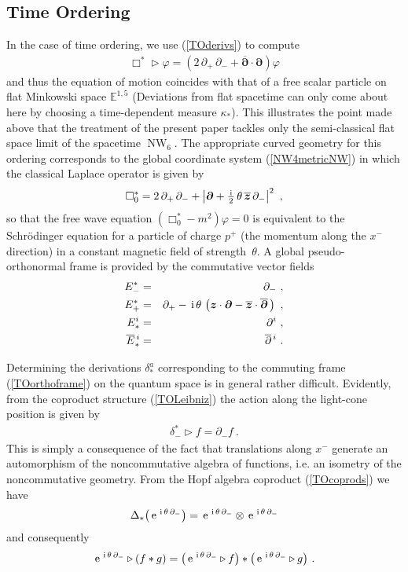 \documentclass[11pt,a4paper]{article}
\DeclareMathOperator{\NW}{NW}
\def\nn{\nonumber}
\newcommand{\1}{\mathbb{1}}
\newcommand{\mbf}[1]{{\boldsymbol {#1} }}
\def\ii{{\,{\rm i}\,}}
\def\mz{{\mbf z}}
\def\mdell{{\mbf\partial}}
\newcommand{\eucl}{{\mathbb E}}
\def\nn{\nonumber}
\def\e{{\,\rm e}\,}
\def\bea{\begin{eqnarray}}
\def\eea{\end{eqnarray}}
\newcommand{\beq}{\begin{eqnarray}}
\newcommand{\eeq}{\end{eqnarray}}
\begin{document}
\subsection{Time Ordering\label{ScalarTO}}

In the case of time ordering, we use (\ref{TOderivs}) to compute
\beq
\Box^*\triangleright\varphi=\left(2\,\partial_+\,\partial_-+
\overline{\mdell}\cdot\mdell\right)\varphi
\label{TOBoxeq}\eeq
and thus the equation of motion coincides with that of a free scalar
particle on flat Minkowski space $\eucl^{1,5}$ (Deviations from
flat spacetime can only come about here by choosing a time-dependent measure
$\kappa_*$). This illustrates the point made above that the treatment
of the present paper tackles only the semi-classical flat space limit of the
spacetime $\NW_6$. The appropriate curved geometry for this ordering
corresponds to the global coordinate system (\ref{NW4metricNW}) in
which the classical Laplace operator is given by
\beq
\Box_0^*=2\,\partial_+\,\partial_-+
\left|\mdell+\mbox{$\frac\ii2$}\,\theta\,\overline{\mz}\,
\partial_-\right|^2 \ ,
\label{TOBox0}\eeq
so that the free wave equation $(\Box_0^*-m^2)\varphi=0$ is equivalent
to the Schr\"odinger equation for a particle of charge $p^+$ (the
momentum along the $x^-$ direction) in a constant magnetic field
of strength~$\theta$. A global pseudo-orthonormal frame is provided by
the commutative vector fields
\bea
E_-^*&=&\partial_- \ , \nn\\ E_+^*&=&\partial_+-\ii\theta\,\left(
\mz\cdot\mdell-\overline{\mz}\cdot\overline{\mdell}\,\right) \ ,
\nn\\ E^{i}_*&=&\partial^i \ , \nn\\
\overline{E}{}_{*}^{\,i}&=&\overline{\partial}{}^{\,i} \ .
\label{TOorthoframe}\eea

Determining the derivations $\delta_*^a$ corresponding to the
commuting frame (\ref{TOorthoframe}) on the quantum space is in
general rather difficult. Evidently, from the coproduct structure
(\ref{TOLeibniz}) the action along the light-cone position is given by
\beq
\delta_-^*\triangleright f=\partial_-f \ .
\label{TOdeltaminus}\eeq
This is simply a consequence of the fact that translations along $x^-$
generate an automorphism of the noncommutative algebra of functions,
i.e. an isometry of the noncommutative geometry. From the Hopf algebra
coproduct (\ref{TOcoprods}) we have
\beq
\Delta_*\bigl(\e^{\ii\theta\,\partial_-}\bigr)=
\e^{\ii\theta\,\partial_-}\otimes\e^{\ii\theta\,\partial_-}
\label{TOcoprodglobal}\eeq
and consequently
\beq
\e^{\ii\theta\,\partial_-}\triangleright(f*g)=\bigl(
\e^{\ii\theta\,\partial_-}\triangleright f\bigr)*\bigl(
\e^{\ii\theta\,\partial_-}\triangleright g\bigr) \ .
\label{xmautoNC}\eeq
\end{document}

